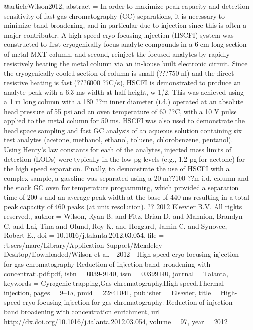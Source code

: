 @article{Wilson2012,
abstract = {In order to maximize peak capacity and detection sensitivity of fast gas chromatography (GC) separations, it is necessary to minimize band broadening, and in particular due to injection since this is often a major contributor. A high-speed cryo-focusing injection (HSCFI) system was constructed to first cryogenically focus analyte compounds in a 6 cm long section of metal MXT column, and second, reinject the focused analytes by rapidly resistively heating the metal column via an in-house built electronic circuit. Since the cryogenically cooled section of column is small (???750 nl) and the direct resistive heating is fast (???6000 ??C/s), HSCFI is demonstrated to produce an analyte peak with a 6.3 ms width at half height, w 1/2. This was achieved using a 1 m long column with a 180 ??m inner diameter (i.d.) operated at an absolute head pressure of 55 psi and an oven temperature of 60 ??C, with a 10 V pulse applied to the metal column for 50 ms. HSCFI was also used to demonstrate the head space sampling and fast GC analysis of an aqueous solution containing six test analytes (acetone, methanol, ethanol, toluene, chlorobenzene, pentanol). Using Henry's law constants for each of the analytes, injected mass limits of detection (LODs) were typically in the low pg levels (e.g., 1.2 pg for acetone) for the high speed separation. Finally, to demonstrate the use of HSCFI with a complex sample, a gasoline was separated using a 20 m??100 ??m i.d. column and the stock GC oven for temperature programming, which provided a separation time of 200 s and an average peak width at the base of 440 ms resulting in a total peak capacity of 460 peaks (at unit resolution). ?? 2012 Elsevier B.V. All rights reserved.},
author = {Wilson, Ryan B. and Fitz, Brian D. and Mannion, Brandyn C. and Lai, Tina and Olund, Roy K. and Hoggard, Jamin C. and Synovec, Robert E.},
doi = {10.1016/j.talanta.2012.03.054},
file = {:Users/marc/Library/Application Support/Mendeley Desktop/Downloaded/Wilson et al. - 2012 - High-speed cryo-focusing injection for gas chromatography Reduction of injection band broadening with concentrati.pdf:pdf},
isbn = {0039-9140},
issn = {00399140},
journal = {Talanta},
keywords = {Cyrogenic trapping,Gas chromatography,High speed,Thermal injection},
pages = {9--15},
pmid = {22841041},
publisher = {Elsevier},
title = {{High-speed cryo-focusing injection for gas chromatography: Reduction of injection band broadening with concentration enrichment}},
url = {http://dx.doi.org/10.1016/j.talanta.2012.03.054},
volume = {97},
year = {2012}
}
